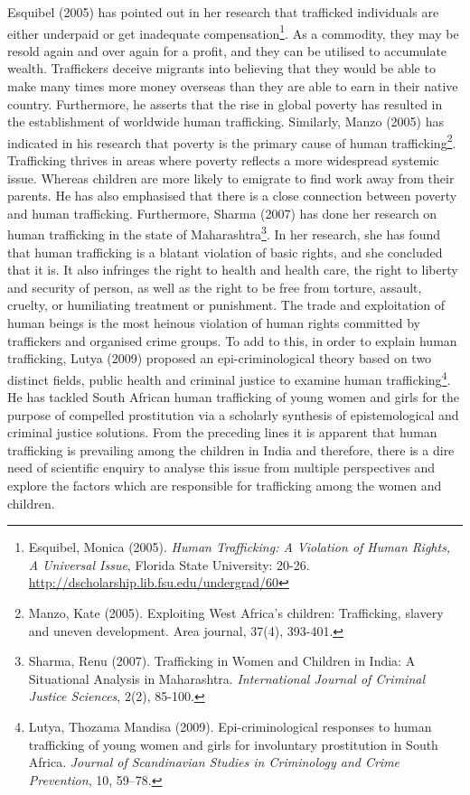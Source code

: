 \begin{multicols}{2}
\noi
Esquibel (2005) has pointed out in her research that trafficked individuals are either underpaid or get inadequate compensation\footnote{Esquibel, Monica (2005). \textit{Human Trafficking: A Violation of Human Rights, A Universal Issue}, Florida State University: 20-26. \url{http://dscholarship.lib.fsu.edu/undergrad/60}}. As a commodity, they may be resold again and over again for a profit, and they can be utilised to accumulate wealth. Traffickers deceive migrants into believing that they would be able to make many times more money overseas than they are able to earn in their native country. Furthermore, he asserts that the rise in global poverty has resulted in the establishment of worldwide human trafficking. Similarly, Manzo (2005) has indicated in his research that poverty is the primary cause of human trafficking\footnote{Manzo, Kate (2005). Exploiting West Africa’s children: Trafficking, slavery and uneven development. Area journal, 37(4), 393-401.}. Trafficking thrives in areas where poverty reflects a more widespread systemic issue. Whereas children are more likely to emigrate to find work away from their parents. He has also emphasised that there is a close connection between poverty and human trafficking. Furthermore, Sharma (2007) has done her research on human trafficking in the state of Maharashtra\footnote{Sharma, Renu (2007). Trafficking in Women and Children in India: A Situational Analysis in Maharashtra. \textit{International Journal of Criminal Justice Sciences}, 2(2), 85-100.}. In her research, she has found that human trafficking is a blatant violation of basic rights, and she concluded that it is. It also infringes the right to health and health care, the right to liberty and security of person, as well as the right to be free from torture, assault, cruelty, or humiliating treatment or punishment. The trade and exploitation of human beings is the most heinous violation of human rights committed by traffickers and organised crime groups. To add to this, in order to explain human trafficking, Lutya (2009) proposed an epi-criminological theory based on two distinct fields, public health and criminal justice to examine human trafficking\footnote{Lutya, Thozama Mandisa (2009). Epi-criminological responses to human trafficking of young women and girls for involuntary prostitution in South Africa. \textit{Journal of Scandinavian Studies in Criminology and Crime Prevention}, 10, 59–78.}. He has tackled South African human trafficking of young women and girls for the purpose of compelled prostitution via a scholarly synthesis of epistemological and criminal justice solutions. From the preceding lines it is apparent that human trafficking is prevailing among the children in India and therefore, there is a dire need of scientific enquiry to analyse this issue from multiple perspectives and explore the factors which are responsible for trafficking among the women and children.


\end{multicols}
